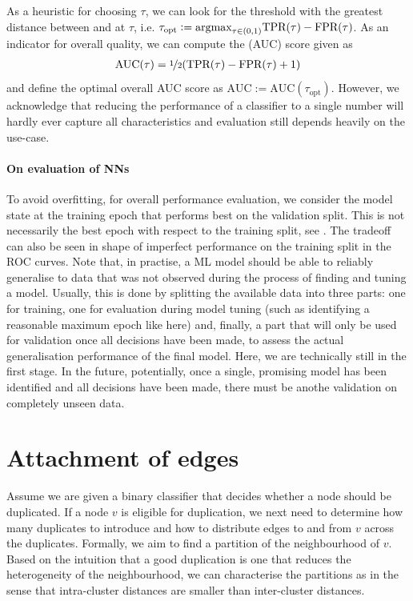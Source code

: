 \documentclass[
	fontsize=10pt, %
	twoside=false, %
	secnumdepth=1, %
  toc=indentunnumbered %
]{kaobook}
\begin{document}
As a heuristic for choosing $\tau$, we can look for the threshold with the greatest
distance between \TPR and \FPR at $\tau$, i.e. $\tau_{\text{opt}} := \argmax_{\tau \in
  (0,1)} \TPR{}(\tau) - \FPR{}(\tau)$.
As an indicator for overall quality, we can compute the 
(AUC) score given as
\begin{align*}
  \text{AUC}(\tau) = \nicefrac{1}{2} (\TPR{}(\tau) - \FPR{}(\tau) + 1)
\end{align*}
and define the optimal overall AUC score as $\text{AUC} := \text{AUC}(\tau_{\text{opt}})$.
However, we acknowledge that reducing the performance of a classifier to a
single number will hardly ever capture all characteristics and evaluation still
depends heavily on the use-case.


\paragraph{On evaluation of NNs} To avoid overfitting, for overall performance
evaluation, we consider the model state at the training epoch that performs best
on the validation split. This is not necessarily the best epoch with respect to
the training split, see . The tradeoff can also be
seen in shape of imperfect performance on the training split in the ROC curves.
% 
%
Note that, in practise, a ML model should be able to reliably generalise to data
that was not observed during the process of finding and tuning a model. Usually,
this is done by splitting the available data into three parts: one for training,
one for evaluation during model tuning (such as identifying a reasonable maximum
epoch like here) and, finally, a part that will only be used for validation once
all decisions have been made, to assess the actual generalisation performance of
the final model.
%
Here, we are technically still in the first stage. In the future, potentially,
once a single, promising model has been identified and all decisions have been
made, there must be anothe validation on completely unseen data.

\section{Attachment of edges}
\label{sec:edge-attachment}


Assume we are given a binary classifier that decides whether a node should be
duplicated. If a node $v$ is eligible for duplication, we next need to determine
how many duplicates to introduce and how to distribute edges to and from $v$
across the duplicates. Formally, we aim to find a partition of the neighbourhood
of $v$. Based on the intuition that a good duplication is one that reduces the
heterogeneity of the neighbourhood, we can characterise the partitions as
 in the sense that intra-cluster distances are smaller than
inter-cluster distances.
\end{document}
